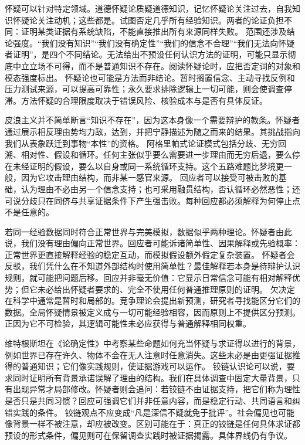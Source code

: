 怀疑可以针对特定领域。道德怀疑论质疑道德知识，记忆怀疑论关注过去，自我知识怀疑论关注动机；这些都是。试图否定几乎所有经验知识。两者的论证负担不同：证明某类证据有系统缺陷，不能直接推出所有来源同样失败。 范围还涉及结论强度。“我们没有知识”“我们没有确定性”“我们的信念不合理”“我们无法向怀疑者证明”，是四个不同结论。无法给出不预设任何认识方法的证明，可能只显示彻底中立立场不可得，而不是普通知识不存在。阅读怀疑论时，应把否定词的对象和模态强度标出。 怀疑论也可能是方法而非结论。暂时搁置信念、主动寻找反例和压力测试来源，可以提高可靠性；永久要求排除逻辑上一切可能，则会使调查停滞。方法怀疑的合理限度取决于错误风险、核验成本与是否有具体反证。

皮浪主义并不简单断言“知识不存在”，因为这本身像一个需要辩护的教条。怀疑者通过展示相反理由势均力敌，达到，并把宁静描述为随之而来的结果\parencite{sextus2000}。其挑战指向我们从表象跃迁到事物“本性”的资格。 阿格里帕式论证模式包括分歧、无穷回溯、相对性、假设和循环。任何主张似乎要么需要进一步理由而无穷后退，要么停在未经证明的假设，要么以自身或同一系统循环支持。这个五路难题比梦境更一般，因为它攻击理由结构，而非某一感官来源。 回应者可以接受可被击败的基础，认为理由不必由另一个信念支持；也可采用融贯结构，否认循环必然恶性；还可说分歧只在同侪与共享证据条件下产生强击败。每种回应都必须解释为何停止点不是任意的。

若同一经验数据同时符合正常世界与完美模拟，数据似乎两种理论。怀疑者由此说，我们没有理由偏向正常世界。回应者可能诉诸简单性、因果解释或先验概率：正常世界更直接解释经验的稳定互动，而模拟假设额外假定复杂装置。 怀疑者会反驳，我们凭什么在不知道外部结构时使用简单性？最佳解释若本身是待辩护认识规则，就可能把问题后移。回应并非毫无价值：它显示日常信念可能有相对解释优势；但它未必给出怀疑者要求的、完全不使用任何普通推理原则的证明。 欠决定在科学中通常是暂时和局部的。竞争理论会提出新预测，研究者寻找能区分它们的数据。全局怀疑情景被定义成与一切可能经验相容，因而原则上不提供区分预测。正因为它不可检验，其逻辑可能性未必应获得与普通解释相同权重。

维特根斯坦在《论确定性》中考察某些命题如何充当怀疑与求证得以进行的背景，例如世界已存在许久、物体不会在无人注意时任意消失\parencite{wittgenstein1969}。这些未必是由更强证据推得的普通知识；它们像实践规则，使证据游戏可以运作。 铰链认识论可以说，要求同时证明所有背景承诺误解了理由的结构。我们在具体调查中固定大量背景，只有出现异常才局部修改。怀疑者则会追问：若铰链不由证据支持，把它们称为理性是否只是共同习惯？回应可强调它们并非任意内容，而是稳定行动、共同语言和纠错实践的条件。 铰链观点不应变成“凡是深信不疑就免于批评”。社会偏见也可能像背景一样不被注意，却应被改变。区别可能在于：真正的铰链是任何具体求证都预设的形式条件，偏见则可在保留调查实践时被证据揭露。具体界线仍有争议。

